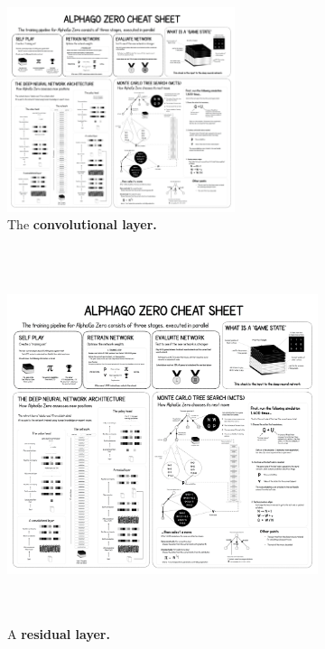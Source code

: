 \documentclass{article}
\begin{document}
\begin{figure}[H]
	\begin{subfigure}{.5\textwidth}
		\centering
		\includegraphics[height=6cm,trim={393px 313px 6855px 6134px},clip]{alpha_go_zero_cheat_sheet.png}
		\caption{The \textbf{convolutional layer.}}
		\label{fig:arch_convolution}
	\end{subfigure}
	\hfill
	\begin{subfigure}{.5\textwidth}
		\centering
		\includegraphics[height=11cm,trim={2518px 305px 4672px 4775px},clip]{alpha_go_zero_cheat_sheet.png}
		\caption{A \textbf{residual layer.}}
		\label{fig:arch_residual}
	\end{subfigure}
	\newline
	\begin{subfigure}{0.5\textwidth}
		\centering

\end{subfigure}
\end{figure}
\end{document}
